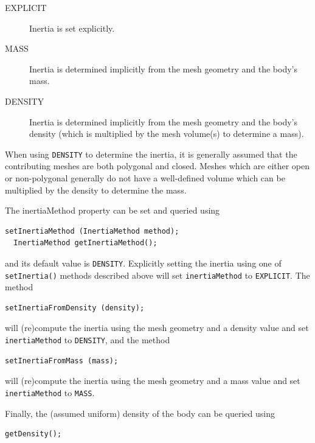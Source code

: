 \begin{description}

\item[EXPLICIT]\mbox{}

Inertia is set explicitly.

\item[MASS]\mbox{}

Inertia is determined implicitly from the mesh geometry and the body's
mass.

\item[DENSITY]\mbox{}

Inertia is determined implicitly from the mesh geometry and the body's
density (which is multiplied by the mesh volume(s) to determine a
mass).

\end{description}

\begin{sideblock}
When using {\tt DENSITY} to determine the inertia, it is generally
assumed that the contributing meshes are both polygonal and
closed. Meshes which are either open or non-polygonal generally do not
have a well-defined volume which can be multiplied by the density to
determine the mass.
\end{sideblock}

The {\sf inertiaMethod} property can be set and queried using
%
\begin{lstlisting}[]
  setInertiaMethod (InertiaMethod method);
  InertiaMethod getInertiaMethod();
\end{lstlisting}
%
and its default value is {\tt DENSITY}. Explicitly setting the
inertia using one of {\tt setInertia()} methods described above will
set {\tt inertiaMethod} to {\tt EXPLICIT}. The method
%
\begin{lstlisting}[]
  setInertiaFromDensity (density); 
\end{lstlisting}
%
will (re)compute the inertia using the mesh geometry and a density value
and set {\tt inertiaMethod} to {\tt DENSITY}, and
the method
%
\begin{lstlisting}[]
  setInertiaFromMass (mass); 
\end{lstlisting}
%
will (re)compute the inertia using the mesh geometry and a mass value
and set {\tt inertiaMethod} to {\tt MASS}.

Finally, the (assumed uniform) density of the body can be queried
using
%
\begin{lstlisting}[]
   getDensity();
\end{lstlisting}
%

